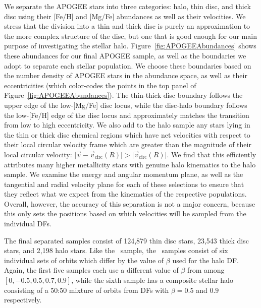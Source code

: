 We separate the APOGEE stars into three categories: halo, thin disc, and thick disc using their [Fe/H] and [Mg/Fe] abundances as well as their velocities. We stress that the division into a thin and thick disc is purely an approximation to the more complex structure of the disc, but one that is good enough for our main purpose of investigating the stellar halo. Figure~\ref{fig:APOGEEAbundances} shows these abundances for our final APOGEE sample, as well as the boundaries we adopt to separate each stellar population. We choose these boundaries based on the number density of APOGEE stars in the abundance space, as well as their eccentricities (which color-codes the points in the top panel of Figure~\ref{fig:APOGEEAbundances}). The thin-thick disc boundary follows the upper edge of the low-[Mg/Fe] disc locus, while the disc-halo boundary follows the low-[Fe/H] edge of the disc locus and approximately matches the transition from low to high eccentricity. We also add to the halo sample any stars lying in the thin or thick disc chemical regions which have net velocities with respect to their local circular velocity frame which are greater than the magnitude of their local circular velocity: $\lvert \vec{v} - \vec{v}_\mathrm{circ}(R) \rvert > \lvert \vec{v}_\mathrm{circ}(R) \rvert $. We find that this efficiently attributes many higher metallicity stars with genuine halo kinematics to the halo sample. We examine the energy and angular momentum plane, as well as the tangential and radial velocity plane for each of these selections to ensure that they reflect what we expect from the kinematics of the respective populations. Overall, however, the accuracy of this separation is not a major concern, because this only sets the positions based on which velocities will be sampled from the individual DFs. 

The final separated samples consist of 124,879 thin disc stars, 23,543 thick disc stars, and 2,198 halo stars. Like the \solar\ sample, the \survey\ samples consist of six individual sets of orbits which differ by the value of $\beta$ used for the halo DF. Again, the first five samples each use a different value of $\beta$ from among $[0,-0.5,0.5,0.7,0.9]$, while the sixth sample has a composite stellar halo consisting of a 50:50 mixture of orbits from DFs with $\beta=0.5$ and $0.9$ respectively.

